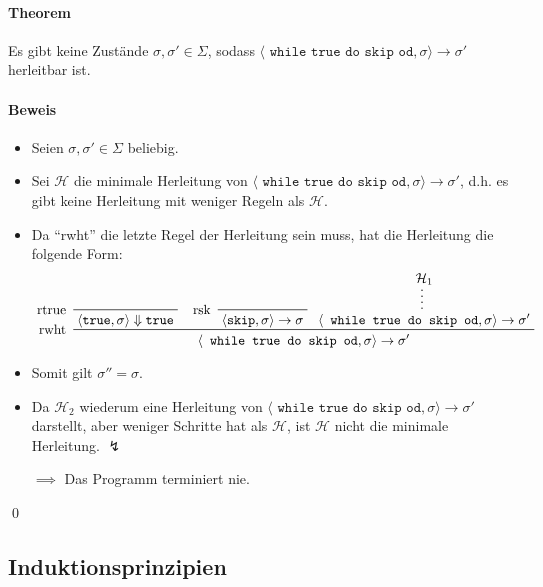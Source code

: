 			    \paragraph{Theorem}
				    Es gibt keine Zustände $ \sigma, \sigma' \in \Sigma $, sodass $ \langle \texttt{ while true do skip od}, \sigma \rangle \rightarrow \sigma' $ herleitbar ist.
				    
			    
			    \paragraph{Beweis}
				    \begin{itemize}
					    \item Seien $ \sigma, \sigma' \in \Sigma $ beliebig.
					    \item Sei $ \mathcal{H} $ die minimale Herleitung von $ \langle \texttt{ while true do skip od}, \sigma \rangle \rightarrow \sigma' $, d.h. es gibt keine Herleitung mit weniger Regeln als $ \mathcal{H} $.
					    \item Da \enquote{rwht} die letzte Regel der Herleitung sein muss, hat die Herleitung die folgende Form:
						    \begin{equation*}
								\prftree[l]
									{ rwht }
									{ \prftree[l]{ rtrue }{ \langle \texttt{true}, \sigma \rangle \Downarrow \texttt{true} } }
									{ \prftree[l]{ rsk }{ \langle \texttt{skip}, \sigma \rangle \rightarrow \sigma } }
									{ \prfsummary{\mathcal{H} _ 1}{ \langle \texttt{ while true do skip od}, \sigma \rangle \rightarrow \sigma' } }
									{ \langle \texttt{ while true do skip od}, \sigma \rangle \rightarrow \sigma' }
						    \end{equation*}
						\item Somit gilt $ \sigma'' = \sigma $.
						\item Da $ \mathcal{H} _ 2 $ wiederum eine Herleitung von $ \langle \texttt{ while true do skip od}, \sigma \rangle \rightarrow \sigma' $ darstellt, aber weniger Schritte hat als $ \mathcal{H} $, ist $ \mathcal{H} $ nicht die minimale Herleitung. $ \lightning $
						\item[$ \implies $] Das Programm terminiert nie.
				    \end{itemize}
				    
				    \qed
	    
	    \subsection{Induktionsprinzipien}

